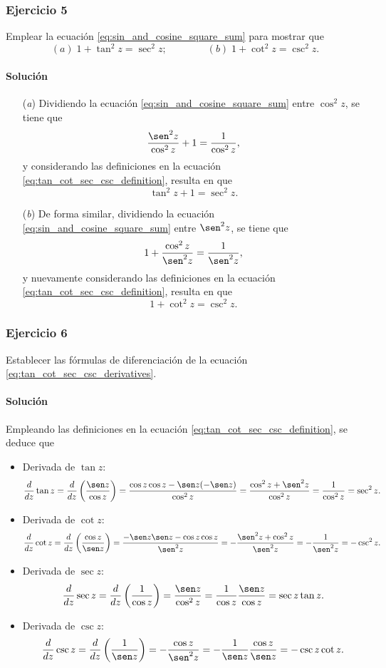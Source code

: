 \documentclass[a4paper]{report}
\begin{document}
\subsubsection{Ejercicio 5}

Emplear la ecuación \ref{eq:sin_and_cosine_square_sum} para mostrar que 
\[
 (\textit{a})\;1+\tan^2z=\sec^2z;\qquad\qquad (\textit{b})\;1+\cot^2z=\csc^2z.
\]

\paragraph{Solución} 

\begin{enumerate}
 \item[(\textit{a})] Dividiendo la ecuación \ref{eq:sin_and_cosine_square_sum} entre \(\cos^2z\), se tiene que 
 \[
  \frac{\sen^2z}{\cos^2z}+1=\frac{1}{\cos^2z},
 \]
 y considerando las definiciones en la ecuación \ref{eq:tan_cot_sec_csc_definition}, resulta en que 
 \[
  \tan^2z+1=\sec^2z.
 \]
 \item[(\textit{b})] De forma similar, dividiendo la ecuación \ref{eq:sin_and_cosine_square_sum} entre \(\sen^2z\), se tiene que
 \[
  1+\frac{\cos^2z}{\sen^2z}=\frac{1}{\sen^2z},
 \]
 y nuevamente considerando las definiciones en la ecuación \ref{eq:tan_cot_sec_csc_definition}, resulta en que 
 \[
  1+\cot^2z=\csc^2z.
 \]
\end{enumerate}

\subsubsection{Ejercicio 6}

Establecer las fórmulas de diferenciación de la ecuación \ref{eq:tan_cot_sec_csc_derivatives}.

\paragraph{Solución} Empleando las definiciones en la ecuación \ref{eq:tan_cot_sec_csc_definition}, se deduce que 
\begin{itemize}
 \item Derivada de \(\tan z\):
 \[
  \frac{d}{dz}\tan z=\frac{d}{dz}\left(\frac{\sen z}{\cos z}\right)
  =\frac{\cos z\cos z-\sen z(-\sen z)}{\cos^2z}
  =\frac{\cos^2z+\sen^2z}{\cos^2z}=\frac{1}{\cos^2z}=\sec^2z.
 \]
 \item Derivada de \(\cot z\):
 \[
  \frac{d}{dz}\cot z=\frac{d}{dz}\left(\frac{\cos z}{\sen z}\right)
  =\frac{-\sen z\sen z-\cos z\cos z}{\sen^2z}
  =-\frac{\sen^2z+\cos^2z}{\sen^2z}=-\frac{1}{\sen^2z}=-\csc^2z.
 \]
 \item Derivada de \(\sec z\):
 \[
  \frac{d}{dz}\sec z=\frac{d}{dz}\left(\frac{1}{\cos z}\right)=\frac{\sen z}{\cos^2z}=\frac{1}{\cos z}\frac{\sen z}{\cos z}=\sec z\tan z.
 \]
  \item Derivada de \(\csc z\):
 \[
  \frac{d}{dz}\csc z=\frac{d}{dz}\left(\frac{1}{\sen z}\right)=-\frac{\cos z}{\sen^2z}=-\frac{1}{\sen z}\frac{\cos z}{\sen z}=-\csc z\cot z.
 \]
\end{itemize}
\end{document}
